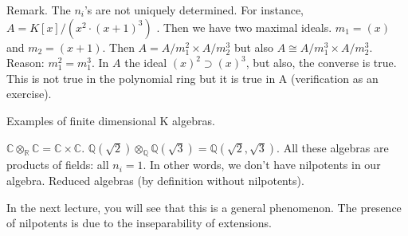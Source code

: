 Remark. The $n_i$'s are not uniquely determined. For instance, $A=K[x]/(x^2\cdot(x+1)^3)$ . Then we have two maximal ideals. $m_1=(x)$ and $m_2 =(x + 1)$. Then $A = A/m_1 ^2\times A/m_2 ^3$ but also $A\cong A/m_1 ^3 \times A/ m_2 ^3$. Reason: $m_1^2= m_1^3$. In $A$ the ideal $(x)^2\supset (x)^3$, but also, the converse is true. This is not true in
the polynomial ring but it is true in A (verification as an exercise).

Examples of finite dimensional K algebras. 
\begin{example}
$\mathbb{C}\otimes_{\mathbb{R}}\mathbb{C}=\mathbb{C}\times\mathbb{C}$. 
$\mathbb{Q}(\sqrt{2})\otimes_{\mathbb{Q}}\mathbb{Q}(\sqrt{3})=\mathbb{Q}(\sqrt{2},\sqrt{3})$. All these algebras are products of fields: all $n_i=1$. In other words, we don't have nilpotents in our algebra. Reduced algebras (by definition  without nilpotents).
\end{example}

In the next lecture, you will see that this is a general phenomenon. The presence of nilpotents is due to the inseparability of extensions.